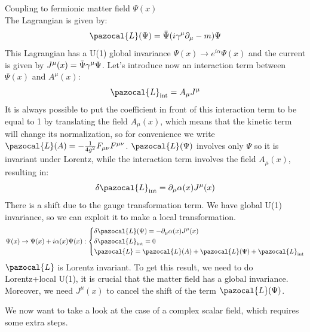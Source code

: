 \documentclass[../main.tex]{subfiles}
\begin{document}
\begin{example}
Coupling to fermionic matter field $\Psi(x)$\\
The Lagrangian is given by:
\[
\pazocal{L}(\Psi)=\Bar{\Psi}(i\gamma^\mu\partial_\mu-m)\Psi
\]
This Lagrangian has a U(1) global invariance $\Psi(x)\to e^{i\alpha}\Psi(x)$ and the current is given by $J^\mu(x)=\Bar{\Psi}\gamma^\mu\Psi$. Let's introduce now an interaction term between $\Psi(x)$ and $A^\mu(x)$:
\[
\pazocal{L}_{\text{int}}=A_\mu J^\mu
\]
It is always possible to put the coefficient in front of this interaction term to be equal to 1 by translating the field $A_\mu(x)$, which means that the kinetic term will change its normalization, so for convenience we write $\pazocal{L}(A)=-\frac{1}{4g^2}F_{\mu\nu}F^{\mu\nu}$. $\pazocal{L}(\Psi)$ involves only $\Psi$ so it is invariant under Lorentz, while the interaction term involves the field $A_\mu(x)$, resulting in:
\[
\delta\pazocal{L}_{\text{int}}=\partial_\mu\alpha(x)J^\mu(x)
\]
There is a shift due to the gauge transformation term. We have global U(1) invariance, so we can exploit it to make a local transformation.
\[
\Psi(x)\to\Psi(x)+i\alpha(x)\Psi(x):\left\{
\begin{aligned}
&\delta\pazocal{L}(\Psi)=-\partial_\mu\alpha(x)J^\mu(x)\\
&\delta\pazocal{L}_{\text{int}}=0\\
&\pazocal{L}=\pazocal{L}(A)+\pazocal{L}(\Psi)+\pazocal{L}_{\text{int}} 
\end{aligned}
\right.
\]
$\pazocal{L}$ is Lorentz invariant. To get this result, we need to do Lorentz+local U(1), it is crucial that the matter field has a global invariance. Moreover, we need $J^\mu(x)$ to cancel the shift of the term $\pazocal{L}(\Psi)$.
\end{example}
We now want to take a look at the case of a complex scalar field, which requires some extra steps.
\end{document}
